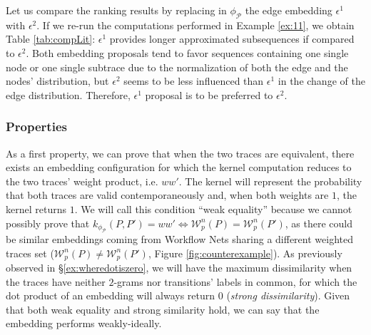\begin{example}\label{ex:cmpexample}
	Let us compare the ranking results by replacing in $\phi_{\mathcal{P}}$ the edge embedding $\epsilon^1$ with $\epsilon^2$. If we re-run the computations performed in  Example \ref{ex:11}, we obtain   Table \ref{tab:compLit}:  $\epsilon^1$ provides longer approximated subsequences if compared to $\epsilon^2$. Both embedding proposals tend to favor sequences containing one single node or one single subtrace due to the normalization of both  the edge and the nodes' distribution, but $\epsilon^2$ seems to be less influenced than $\epsilon^1$ in the change of the edge distribution. Therefore, $\epsilon^1$ proposal is to be preferred to $\epsilon^2$.
\end{example}


\subsubsection{Properties}
As a first property, we can prove that when the two traces are equivalent,  there exists an embedding configuration for which the kernel computation reduces to the two traces' weight product, i.e. $ww'$. The kernel will represent the probability that both traces are valid contemporaneously and, when both weights are $1$, the kernel returns $1$. We will call this condition  ``weak equality'' because we cannot possibly prove that $k_{\phi_{\mathcal{P}}}(P,P')=ww'\Leftrightarrow \mathcal{W}_p^n(P)=\mathcal{W}_p^n(P')$, as there could be similar embeddings coming from Workflow Nets sharing a different weighted traces set ($\mathcal{W}_p^n(P)\neq\mathcal{W}_p^n(P')$, Figure \ref{fig:counterexample}). As previously observed in \S\ref{ex:wheredotiszero}, we will have the maximum dissimilarity when the traces have neither $2$-grams nor transitions' labels in common, for which the dot product of an embedding will always return $0$ (\textit{strong dissimilarity}). Given that both weak equality and strong similarity hold, we can say that the embedding performs weakly-ideally.


